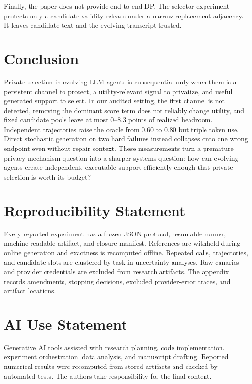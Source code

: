 \documentclass{article}
\begin{document}
Finally, the paper does not provide end-to-end DP. The selector experiment protects only a candidate-validity release under a narrow replacement adjacency. It leaves candidate text and the evolving transcript trusted.

\section{Conclusion}

Private selection in evolving LLM agents is consequential only when there is a persistent channel to protect, a utility-relevant signal to privatize, and useful generated support to select. In our audited setting, the first channel is not detected, removing the dominant score term does not reliably change utility, and fixed candidate pools leave at most 0--8.3 points of realized headroom. Independent trajectories raise the oracle from 0.60 to 0.80 but triple token use. Direct stochastic generation on two hard failures instead collapses onto one wrong endpoint even without repair context. These measurements turn a premature privacy mechanism question into a sharper systems question: how can evolving agents create independent, executable support efficiently enough that private selection is worth its budget?

\section*{Reproducibility Statement}

Every reported experiment has a frozen JSON protocol, resumable runner, machine-readable artifact, and closure manifest. References are withheld during online generation and exactness is recomputed offline. Repeated calls, trajectories, and candidate slots are clustered by task in uncertainty analyses. Raw canaries and provider credentials are excluded from research artifacts. The appendix records amendments, stopping decisions, excluded provider-error traces, and artifact locations.

\section*{AI Use Statement}

Generative AI tools assisted with research planning, code implementation, experiment orchestration, data analysis, and manuscript drafting. Reported numerical results were recomputed from stored artifacts and checked by automated tests. The authors take responsibility for the final content.





\end{document}
